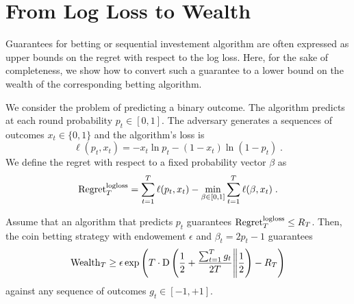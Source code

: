 \section{From Log Loss to Wealth}
\label{section:logloss-to-wealth}

Guarantees for betting or sequential investement algorithm are often expressed
as upper bounds on the regret with respect to the log loss.  Here, for the sake
of completeness, we show how to convert such a guarantee to a lower bound on
the wealth of the corresponding betting algorithm.

We consider the problem of predicting a binary outcome.  The algorithm predicts
at each round probability $p_t \in [0,1]$. The adversary generates a sequences
of outcomes $x_t \in \{0,1\}$ and the algorithm's loss is
\[
\ell(p_t,x_t) = -x_t \ln p_t -(1-x_t) \ln (1-p_t) \; .
\]
We define the regret with respect to a fixed probability vector $\beta$ as
\[
\operatorname{Regret}^{\mathrm{logloss}}_T = \sum_{t=1}^T \ell(p_t,x_t) - \min_{\beta \in [0,1]} \sum_{t=1}^T \ell(\beta,x_t) \; .
\]

\begin{lemma}
Assume that an algorithm that predicts $p_t$ guarantees
$\operatorname{Regret}^{\mathrm{logloss}}_T \leq R_T$.  Then, the coin betting strategy with
endowement $\epsilon$ and $\beta_t = 2 p_{t}-1$ guarantees
\[
\operatorname{Wealth}_T \ge \epsilon \exp\left(T \cdot \operatorname{D}\left({\frac{1}{2} + \frac{\sum_{t=1}^T g_t}{2 T}}\middle\|{\frac{1}{2}}\right) - R_T \right)
\]
against any sequence of outcomes $g_t \in [-1,+1]$.
\end{lemma}

